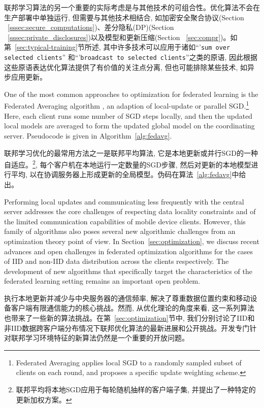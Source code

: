 联邦学习算法的另一个重要的实际考虑是与其他技术的可组合性。优化算法不会在生产部署中单独运行, 但需要与其他技术相结合, 如加密安全聚合协议(Section ~\ref{sssec:secure_computations})、差分隐私(DP)(Section ~\ref{sssec:private_disclosures})以及模型和更新压缩(Section ~\ref{sec:compr})。如第~\ref{sec:typical-training}节所述, 其中许多技术可以应用于诸如``'\texttt{sum over selected clients}''  和``'\texttt{broadcast to selected clients}''之类的原语, 因此根据这些原语表达优化算法提供了有价值的关注点分离, 但也可能排除某些技术, 如异步应用更新。
 
One of the most common approaches to optimization for federated learning is the Federated Averaging algorithm \citep{mcmahan17fedavg}, an adaption of local-update or parallel SGD.\footnote{Federated Averaging applies local SGD to a randomly sampled subset of clients on each round, and proposes a specific update weighting scheme.} Here, each client runs some number of SGD steps locally, and then the updated local models are averaged to form the updated global model on the coordinating server. Pseudocode is given in Algorithm~\ref{alg:fedavg}.

联邦学习优化的最常用方法之一是联邦平均算法, 它是本地更新或并行SGD的一种自适应。\footnote{联邦平均将本地SGD应用于每轮随机抽样的客户端子集, 并提出了一种特定的更新加权方案。}, 每个客户机在本地运行一定数量的SGD步骤, 然后对更新的本地模型进行平均, 以在协调服务器上形成更新的全局模型。伪码在算法~\ref{alg:fedavg}中给出。

Performing local updates and  communicating less frequently with the central server addresses the core challenges of respecting data locality constraints and of the limited communication capabilities of mobile device clients. However, this family of algorithms also poses several new algorithmic challenges from an optimization theory point of view. In Section~\ref{sec:optimization}, we discuss recent advances and open challenges in federated optimization algorithms for the cases of IID and non-IID data distribution across the clients respectively. The development of new algorithms that specifically target the characteristics of the federated learning setting remains an important open problem.

执行本地更新并减少与中央服务器的通信频率, 解决了尊重数据位置约束和移动设备客户端有限通信能力的核心挑战。然而, 从优化理论的角度来看, 这一系列算法也带来了一些新的算法挑战。在第~\ref{sec:optimization}节中, 我们分别讨论了IID和非IID数据跨客户端分布情况下联邦优化算法的最新进展和公开挑战。开发专门针对联邦学习环境特征的新算法仍然是一个重要的开放问题。


